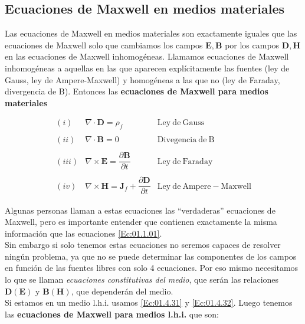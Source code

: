 \documentclass[12pt,a4paper]{article}
\newcommand{\rota}{\nabla \times}
\newcommand{\dive}{\nabla \cdot}
\newcommand{\Bn}{\mathbf{B}}
\newcommand{\En}{\mathbf{E}}
\newcommand{\Dn}{\mathbf{D}}
\newcommand{\Hn}{\mathbf{H}}
\newcommand{\Jn}{\mathbf{J}}
\numberwithin{equation}{section}
\numberwithin{figure}{section}
\begin{document}
\subsection{Ecuaciones de Maxwell en medios materiales}

Las ecuaciones de Maxwell en medios materiales son exactamente iguales que las ecuaciones de Maxwell solo que cambiamos los campos $\En,\Bn$ por los campos $\Dn,\Hn$ en las ecuaciones de Maxwell inhomogéneas. Llamamos ecuaciones de Maxwell inhomogéneas a aquellas en las que aparecen explícitamente las fuentes (ley de Gauss, ley de Ampere-Maxwell) y homogéneas a las que no (ley de Faraday, divergencia de B). Entonces las \textbf{ecuaciones de Maxwell para medios materiales}

\begin{equation}
\begin{array}{rll}
(i) & \dive \Dn =  \rho_f & \mathrm{Ley \ de \ Gauss} \\ \\
(ii) & \dive \Bn = 0  & \mathrm{Divegencia \ de \ B} \\ \\
(iii) & \rota \En = \dfrac{\partial \Bn}{ \partial t}  & \mathrm{Ley \ de \ Faraday} \\ \\
(iv) & \rota \Hn=  \Jn_f +  \dfrac{\partial \Dn}{\partial t} & \mathrm{Ley \ de \ Ampere-Maxwell} 
\end{array} \label{Ec:01.5.31}
\end{equation}

Algunas personas llaman a estas ecuaciones las ``verdaderas'' ecuaciones de Maxwell, pero es importante entender que contienen exactamente la misma información que las ecuaciones \ref{Ec:01.1.01}. \\

 Sin embargo si solo tenemos estas ecuaciones no seremos capaces de resolver ningún problema, ya que no se puede determinar las componentes de los campos en función de las fuentes libres con solo 4 ecuaciones. Por eso mismo necesitamos lo que se llaman \textit{ecuaciones constitutivas del medio}, que serán las relaciones $\Dn(\En)$ y $\Bn (\Hn)$, que dependerán del medio. \\
 
Si estamos en un medio l.h.i. usamos \ref{Ec:01.4.31} y \ref{Ec:01.4.32}.   Luego tenemos las \textbf{ ecuaciones de Maxwell para medios l.h.i.} que son:
\end{document}
